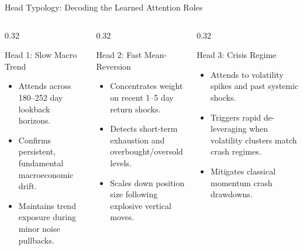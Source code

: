 \documentclass[10pt]{beamer}
\begin{document}
\begin{frame}{Head Typology: Decoding the Learned Attention Roles}
  \begin{columns}[t]
    \begin{column}{0.32\textwidth}
      \begin{block}{Head 1: Slow Macro Trend}
        \begin{itemize}\scriptsize
          \item Attends across 180--252 day lookback horizons.
          \item Confirms persistent, fundamental macroeconomic drift.
          \item Maintains trend exposure during minor noise pullbacks.
        \end{itemize}
      \end{block}
    \end{column}
    \begin{column}{0.32\textwidth}
      \begin{block}{Head 2: Fast Mean-Reversion}
        \begin{itemize}\scriptsize
          \item Concentrates weight on recent 1--5 day return shocks.
          \item Detects short-term exhaustion and overbought/oversold levels.
          \item Scales down position size following explosive vertical moves.
        \end{itemize}
      \end{block}
    \end{column}
    \begin{column}{0.32\textwidth}
      \begin{block}{Head 3: Crisis Regime}
        \begin{itemize}\scriptsize
          \item Attends to volatility spikes and past systemic shocks.
          \item Triggers rapid de-leveraging when volatility clusters match crash regimes.
          \item Mitigates classical momentum crash drawdowns.
        \end{itemize}
      \end{block}
    \end{column}
  \end{columns}
\end{frame}
\end{document}
